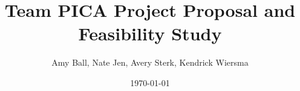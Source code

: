 \documentclass[11pt,letterpaper,titlepage,toc]{article}
\title{Team PICA Project Proposal and Feasibility Study}
\date{\today}
\author{Amy Ball, Nate Jen, Avery Sterk, Kendrick Wiersma}
\begin{document}
\maketitle
\newpage
\tableofcontents
\listoffigures
\listoftables
\lstlistoflistings
\newpage


















%
%
\end{document}
